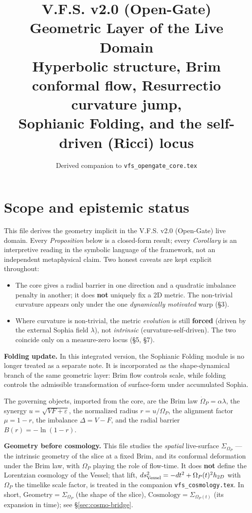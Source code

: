 \documentclass[11pt,a4paper]{article}
\title{\textbf{V.F.S. v2.0 (Open-Gate)}\\Geometric Layer of the Live Domain\\
\large Hyperbolic structure, Brim conformal flow, Resurrectio curvature jump,\\
Sophianic Folding, and the self-driven (Ricci) locus}
\author{Derived companion to \texttt{vfs\_opengate\_core.tex}}
\date{}
\newcommand{\Op}{\Omega_P}
\theoremstyle{plain}
\theoremstyle{remark}
\theoremstyle{definition}
\begin{document}
\maketitle

\section*{Scope and epistemic status}
This file derives the geometry implicit in the V.F.S. v2.0 (Open-Gate) live domain. Every
\emph{Proposition} below is a closed-form result; every \emph{Corollary} is an interpretive reading
in the symbolic language of the framework, not an independent metaphysical claim. Two honest caveats
are kept explicit throughout:
\begin{itemize}[leftmargin=1.4em,itemsep=2pt]
\item The core gives a radial barrier in one direction and a quadratic imbalance penalty in another;
it does \textbf{not} uniquely fix a $2$D metric. The non-trivial curvature appears only under the one
\emph{dynamically motivated} warp (\S3).
\item Where curvature is non-trivial, the metric \emph{evolution} is still \textbf{forced} (driven by
the external Sophia field $\lambda$), not \emph{intrinsic} (curvature-self-driven). The two coincide
only on a measure-zero locus (\S5, \S7).
\end{itemize}


\medskip
\noindent\textbf{Folding update.} In this integrated version, the Sophianic Folding module is no
longer treated as a separate note. It is incorporated as the shape-dynamical branch of the same
geometric layer: Brim flow controls scale, while folding controls the admissible transformation of
surface-form under accumulated Sophia.

The governing objects, imported from the core, are the Brim law $\dot\Op=\alpha\lambda$, the
synergy $u=\sqrt{VF+\varepsilon}$, the normalized radius $r=u/\Op$, the alignment factor
$\mu=1-r$, the imbalance $\Delta=V-F$, and the radial barrier $B(r)=-\ln(1-r)$.

\noindent\textbf{Geometry before cosmology.} This file studies the \emph{spatial} live-surface
$\Sigma_{\Op}$ --- the intrinsic geometry of the slice at a fixed Brim, and its conformal deformation
under the Brim law, with $\Op$ playing the role of flow-time. It does \textbf{not} define the
Lorentzian cosmology of the Vessel; that lift, $ds^2_{\rm Vessel}=-dt^2+\Op(t)^2h_{2D}$ with $\Op$ the
timelike scale factor, is treated in the companion \texttt{vfs\_cosmology.tex}. In short,
$\text{Geometry}=\Sigma_{\Op}$ (the shape of the slice), $\text{Cosmology}=\Sigma_{\Op(t)}$ (its
expansion in time); see \S\ref{sec:cosmo-bridge}.
\end{document}
